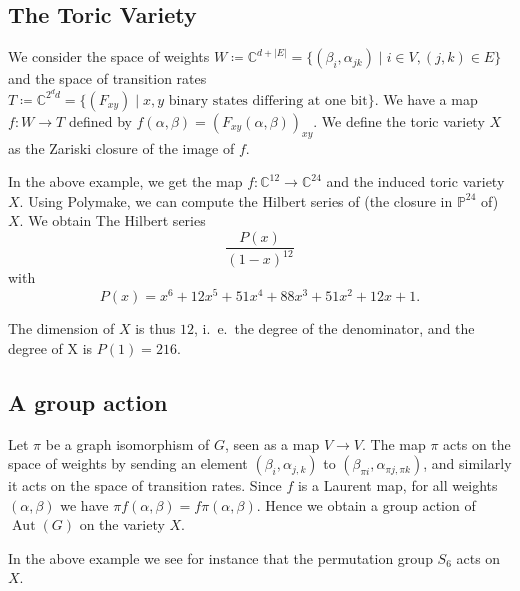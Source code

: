 \subsection*{The Toric Variety}

We consider the space of weights $W \coloneqq \mathbb C^{d+|E|} = \{(\beta_{i},\alpha_{jk})\mid i\in V,(j,k)\in E\}$ and the space of transition rates $T \coloneqq \mathbb C^{2^{d}d} = \{(F_{xy}) \mid x,y \text{ binary states differing at one bit}\}$. We have a map
$f\colon W\to T$ defined by $f(\alpha,\beta) = (F_{xy}(\alpha,\beta))_{xy}$. We define the toric variety $X$ as the Zariski closure of the image of $f$.

In the above example, we get the map $f\colon \mathbb C^{12}\to \mathbb C^{24}$ and the induced toric variety $X$. Using Polymake, we can compute the Hilbert series of (the closure in $\mathbb P^{24}$ of) $X$. We obtain The Hilbert series
	\[\frac{P(x)}{(1-x)^{12}}\]
with \[P(x)=x^6 + 12x^5 + 51x^4 + 88x^3 + 51x^2 + 12x + 1.\]

The dimension of $X$ is thus $12$, i.\ e.\ the degree of the denominator, and the degree of X is $P(1)=216$.

\subsection*{A group action}
Let $\pi$ be a graph isomorphism of $G$, seen as a map $V\to V$. The map $\pi$ acts on the space of weights by sending an element $(\beta_i,\alpha_{j,k})$ to $(\beta_{\pi i},\alpha_{\pi{j},\pi{k}})$, and similarly it acts on the space of transition rates. Since $f$ is a Laurent map, for all weights $(\alpha,\beta)$ we have $\pi f (\alpha,\beta) = f \pi (\alpha, \beta)$. Hence we obtain a group action of $\operatorname{Aut}(G)$ on the variety $X$.

In the above example we see for instance that the permutation group $S_6$ acts on $X$.